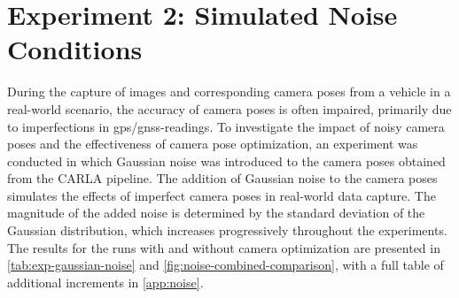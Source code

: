 \section{Experiment 2: Simulated Noise Conditions} \label{sec:gaussian-noise}

During the capture of images and corresponding camera poses from a vehicle in a real-world scenario, the accuracy of camera poses is often impaired, primarily due to imperfections in \acrshort{gps}/\acrshort{gnss}-readings. To investigate the impact of noisy camera poses and the effectiveness of camera pose optimization, an experiment was conducted in which Gaussian noise was introduced to the camera poses obtained from the CARLA pipeline. The addition of Gaussian noise to the camera poses simulates the effects of imperfect camera poses in real-world data capture. The magnitude of the added noise is determined by the standard deviation of the Gaussian distribution, which increases progressively throughout the experiments. The results for the runs with and without camera optimization are presented in \autoref{tab:exp-gaussian-noise} and \autoref{fig:noise-combined-comparison}, with a full table of additional increments in \autoref{app:noise}.

